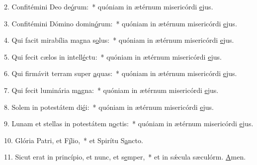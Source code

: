 2. Confitémini Deo de\uline{ó}rum:~* quóniam in ætérnum misericórdi \uline{e}jus.\par 
3. Confitémini Dómino domin\uline{ó}rum:~* quóniam in ætérnum misericórdi \uline{e}jus.\par 
4. Qui facit mirabília magna s\uline{o}lus:~* quóniam in ætérnum misericórdi \uline{e}jus.\par 
5. Qui fecit cælos in intell\uline{é}ctu:~* quóniam in ætérnum misericórdi \uline{e}jus.\par 
6. Qui firmávit terram super \uline{a}quas:~* quóniam in ætérnum misericórdi \uline{e}jus.\par 
7. Qui fecit luminária m\uline{a}gna:~* quóniam in ætérnum misericórdi \uline{e}jus.\par 
8. Solem in potestátem di\uline{é}i:~* quóniam in ætérnum misericórdi \uline{e}jus.\par 
9. Lunam et stellas in potestátem n\uline{o}ctis:~* quóniam in ætérnum misericórdi \uline{e}jus.\par 
10. Glória Patri, et F\uline{í}lio,~* et Spirítu S\uline{a}ncto.\par 
11. Sicut erat in princípio, et nunc, et s\uline{e}mper,~* et in sǽcula sæculórm. \uline{A}men.\par 
